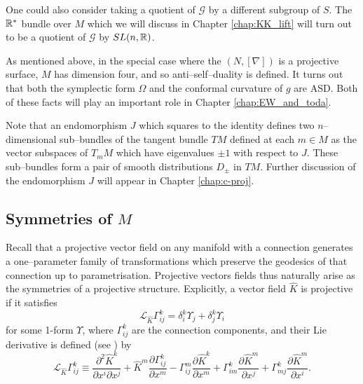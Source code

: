 \begin{rmk}
One could also consider taking a quotient of $\mathcal{G}$ by a different subgroup of $S$. The $\mathbb{R}^*$ bundle over $M$ which we will discuss in Chapter \ref{chap:KK_lift} will turn out to be a quotient of $\mathcal{G}$ by $SL(n,\mathbb{R})$.
\end{rmk}

\begin{rmk}
As mentioned above, in the special case where the $(N,[\nabla])$ is a projective surface, $M$ has dimension four, and so anti--self--duality is defined. It turns out that both the symplectic form $\Omega$ and the conformal curvature of $g$ are ASD. Both of these facts will play an important role in Chapter \ref{chap:EW_and_toda}.
\end{rmk}

\begin{rmk}
Note that an endomorphism $J$ which squares to the identity defines two $n$--dimensional sub--bundles of the tangent bundle $TM$ defined at each $m\in M$ as the vector subspaces of $T_mM$ which have eigenvalues $\pm 1$ with respect to $J$. These sub--bundles form a pair of smooth distributions $D_\pm$ in $TM$. Further discussion of the endomorphism $J$ will appear in Chapter \ref{chap:c-proj}.
\end{rmk}

\subsection{Symmetries of $M$}

Recall that a projective vector field on any manifold with a connection
generates a one--parameter family of transformations which preserve the
geodesics of that connection up to parametrisation. Projective vectors
fields thus naturally arise as the symmetries of a projective structure.
Explicitly, a vector field $\widehat{K}$ is projective if it satisfies
\begin{equation}
\mathcal{L}_{\widehat{K}}\Gamma_{ij}^{k}=\delta_{i}^{k}\Upsilon_{j}+\delta_{j}^{k}\Upsilon_{i}\label{eq:proj_transf}
\end{equation}
for some 1-form $\Upsilon$, where $\Gamma_{ij}^{k}$ are the connection
components, and their Lie derivative is defined (see \cite{yano})
by
\begin{equation}
\mathcal{L}_{\widehat{K}}\Gamma_{ij}^{k}\equiv\frac{\partial^{2}\widehat{K}^{k}}{\partial x^{i}\partial x^{j}}+\widehat{K}^{m}\frac{\partial\Gamma_{ij}^{k}}{\partial x^{m}}-\Gamma_{ij}^{m}\frac{\partial \widehat{K}^{k}}{\partial x^{m}}+\Gamma_{im}^{k}\frac{\partial \widehat{K}^{m}}{\partial x^{j}}+\Gamma_{mj}^{k}\frac{\partial \widehat{K}^{m}}{\partial x^{i}}.\label{eq:liederivGamma}
\end{equation}


